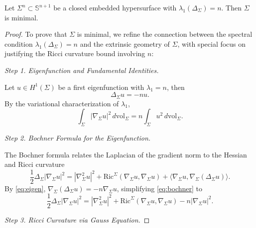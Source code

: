 \documentclass[10pt,a4paper]{amsart}
\begin{document}
\begin{thm}\label{converse-thm}
Let $\Sigma^n \subset \mathbb{S}^{n+1}$ be a closed embedded hypersurface with $\lambda_1(\Delta_\Sigma) = n$. Then $\Sigma$ is minimal.
\end{thm}

 \begin{proof}
To prove that \(\Sigma\) is minimal, we refine the connection between the spectral condition \(\lambda_1(\Delta_\Sigma) = n\) and the extrinsic geometry of \(\Sigma\), with special focus on justifying the Ricci curvature bound involving \(n\):


\textit{Step 1. Eigenfunction and Fundamental Identities.}

Let \(u \in H^1(\Sigma)\) be a first eigenfunction with \(\lambda_1 = n\), then
\begin{equation}\label{eq:eigen}
\Delta_\Sigma u = -n u.
\end{equation}
By the variational characterization of \(\lambda_1\),
\begin{equation}\label{eq:rayleigh}
\int_\Sigma |\nabla_\Sigma u|^2 \, d\mathrm{vol}_\Sigma = n \int_\Sigma u^2 \, d\mathrm{vol}_\Sigma.
\end{equation}


\textit{Step 2. Bochner Formula for the Eigenfunction.}

The Bochner formula relates the Laplacian of the gradient norm to the Hessian and Ricci curvature
\begin{equation}\label{eq:bochner}
\frac{1}{2} \Delta_\Sigma |\nabla_\Sigma u|^2 = |\nabla^2_\Sigma u|^2 + \text{Ric}^\Sigma(\nabla_\Sigma u, \nabla_\Sigma u) + \langle \nabla_\Sigma u, \nabla_\Sigma (\Delta_\Sigma u) \rangle.
\end{equation}
By \eqref{eq:eigen}, \(\nabla_\Sigma (\Delta_\Sigma u) = -n \nabla_\Sigma u\), simplifying \eqref{eq:bochner} to
\begin{equation}\label{eq:bochner_simplified}
\frac{1}{2} \Delta_\Sigma |\nabla_\Sigma u|^2 = |\nabla^2_\Sigma u|^2 + \text{Ric}^\Sigma(\nabla_\Sigma u, \nabla_\Sigma u) - n |\nabla_\Sigma u|^2.
\end{equation}


\textit{Step 3. Ricci Curvature via Gauss Equation.}


\end{proof}
\end{document}
